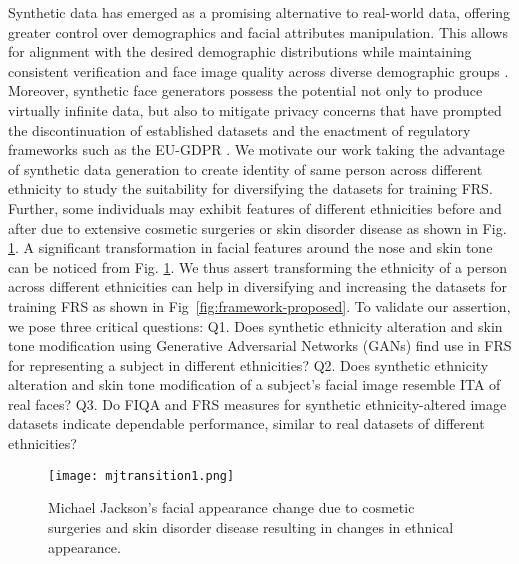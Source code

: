 {  
Synthetic data has emerged as a promising alternative to real-world data, offering greater control over demographics and facial attributes manipulation. This allows for alignment with the desired demographic distributions while maintaining consistent verification and face image quality across diverse demographic groups \cite{melzi2024synthetic}. Moreover, synthetic face generators possess the potential not only to produce virtually infinite data, but also to mitigate privacy concerns that have prompted the discontinuation of established datasets and the enactment of regulatory frameworks such as the EU-GDPR \cite{GDPR}. We motivate our work taking the advantage of synthetic data generation to create identity of same person across different ethnicity to study the suitability for diversifying the datasets for training FRS. Further, some individuals may exhibit features of different ethnicities before and after due to extensive cosmetic surgeries \cite{Jackson93} or skin disorder disease \cite{Jackson2012} as shown in Fig. \ref{fig:Michael}. A significant transformation in facial features around the nose and skin tone can be noticed from Fig. \ref{fig:Michael}. We thus assert transforming the ethnicity of a person across different ethnicities can help in diversifying and increasing the datasets for training FRS as shown in Fig~\ref{fig:framework-proposed}. To validate our assertion, we pose three critical questions:  Q1. Does synthetic ethnicity alteration and skin tone modification using Generative Adversarial Networks (GANs) find use in FRS for representing a subject in different ethnicities? Q2. Does synthetic ethnicity alteration and skin tone modification of a subject's facial image  resemble ITA of real faces? Q3. Do FIQA and FRS measures for synthetic ethnicity-altered image datasets indicate dependable performance, similar to real datasets of different ethnicities?
\begin{figure}[htp]
    \centering
    \texttt{[image: mjtransition1.png]}
    \caption{Michael Jackson's facial appearance change due to cosmetic surgeries and skin disorder disease resulting in changes in ethnical appearance.}
    \label{fig:Michael}
\end{figure}

}
